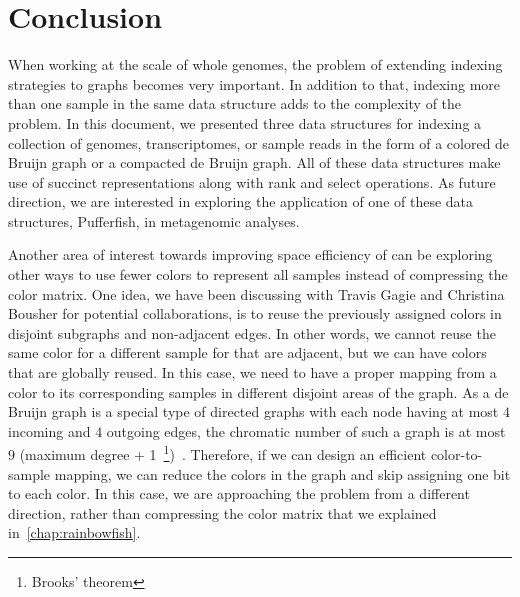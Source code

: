 \chapter{Conclusion}

When working at the scale of whole genomes,
the problem of extending indexing strategies to graphs becomes very important.
In addition to that, indexing more than one sample in the same data structure
adds to the complexity of the problem.
In this document, we presented three data structures
for indexing a collection of genomes, transcriptomes, or sample reads
in the form of a colored de Bruijn graph or a compacted de Bruijn graph.
All of these data structures make use of succinct representations
along with rank and select operations.
As future direction, we are interested in exploring the application
of one of these data structures, Pufferfish, in metagenomic analyses.

Another area of interest towards improving space efficiency of \cdbgs
can be exploring other ways to use fewer colors to represent all samples instead of compressing the color matrix. One idea, we have been discussing with Travis Gagie and Christina Bousher for potential collaborations, is to reuse the previously assigned colors in disjoint subgraphs and non-adjacent edges. In other words, we cannot reuse the same color for a different sample for \kmers that are adjacent, but we can have colors that are globally reused. In this case, we need to have a proper mapping from a color to its corresponding samples in different disjoint areas of the graph. As a de Bruijn graph is a special type of directed graphs with each node having at most $4$ incoming and $4$ outgoing edges, the chromatic number of such a graph is at most $9$ (maximum degree + 1~\footnote{Brooks' theorem})~\cite{cranston2015brooks}. Therefore, if we can design an efficient color-to-sample mapping, we can reduce the colors in the graph and skip assigning one bit to each color. In this case, we are approaching the problem from a different direction, rather than compressing the color matrix that we explained in~\ref{chap:rainbowfish}.

